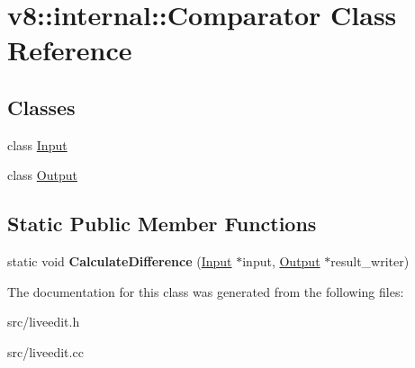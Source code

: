 \hypertarget{classv8_1_1internal_1_1_comparator}{}\section{v8\+:\+:internal\+:\+:Comparator Class Reference}
\label{classv8_1_1internal_1_1_comparator}
\subsection*{Classes}
\begin{DoxyCompactItemize}
\item 
class \hyperlink{classv8_1_1internal_1_1_comparator_1_1_input}{Input}
\item 
class \hyperlink{classv8_1_1internal_1_1_comparator_1_1_output}{Output}
\end{DoxyCompactItemize}
\subsection*{Static Public Member Functions}
\begin{DoxyCompactItemize}
\item 
\hypertarget{classv8_1_1internal_1_1_comparator_a89c50d6f12242f6aed16be0efa54e9e6}{}static void {\bfseries Calculate\+Difference} (\hyperlink{classv8_1_1internal_1_1_comparator_1_1_input}{Input} $\ast$input, \hyperlink{classv8_1_1internal_1_1_comparator_1_1_output}{Output} $\ast$result\+\_\+writer)\label{classv8_1_1internal_1_1_comparator_a89c50d6f12242f6aed16be0efa54e9e6}

\end{DoxyCompactItemize}


The documentation for this class was generated from the following files\+:\begin{DoxyCompactItemize}
\item 
src/liveedit.\+h\item 
src/liveedit.\+cc\end{DoxyCompactItemize}
